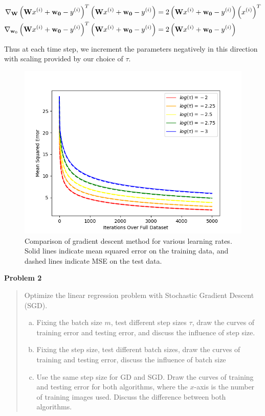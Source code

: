 \documentclass{article}
\newenvironment{quotationb}%
{\begin{leftbar}\begin{quotation}\noindent}
{\end{quotation}\end{leftbar}}
\begin{document}
$$
\begin{aligned}
\nabla_{\bf W} \left({\bf W}x^{(i)} + {\bf w_0} - y^{(i)}\right)^{T} \left({\bf W}x^{(i)} + {\bf w_0} - y^{(i)}\right) & = 2\left({\bf W}x^{(i)} + {\bf w_0} - y^{(i)}\right) \left(x^{(i)}\right)^T\\
\nabla_{{\bf w}_0} \left({\bf W}x^{(i)} + {\bf w_0} - y^{(i)}\right)^{T} \left({\bf W}x^{(i)} + {\bf w_0} - y^{(i)}\right) & = 2 \left({\bf W}x^{(i)} + {\bf w_0} - y^{(i)}\right)
\end{aligned}
$$

Thus at each time step, we increment the parameters negatively in this direction with scaling provided by our choice of $\tau$. 


\begin{figure}[h!]
\centerline{
\includegraphics[width= 18cm]{img/problem_1/step_size.png}
}
\caption{\label{fig:fig1}Comparison of gradient descent method for various learning rates. Solid lines indicate mean squared error on the training data, and dashed lines indicate MSE on the test data.}
\end{figure}

\newpage

\bigskip
{\Large {\bf Problem 2}}
\bigskip

\begin{quotationb}Optimize the linear regression problem with Stochastic Gradient Descent (SGD). 
\begin{enumerate}[(a)]
\item Fixing the batch size $m$, test different step sizes $\tau$, draw the curves of training error and testing error, and discuss the influence of step size. 
\item Fixing the step size, test different batch sizes, draw the curves of training and testing error, discuss the influence of batch size
\item Use the same step size for GD and SGD. Draw the curves of training and testing error for both algorithms, where the $x$-axis is the number of training images used. Discuss the difference between both algorithms.
\end{enumerate}
\end{quotationb}
\end{document}
